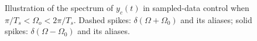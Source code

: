 \documentclass [11pt, proquest] {uwthesis}[2020/02/24]
\begin{document}
\begin{figure}[!ht]
\begin{centering}
{\begin{centering}
\par\end{centering}
}
\par\end{centering}
\begin{centering}
\par\end{centering}
\caption{\label{fig:Illustration-of-the}Illustration of the spectrum of $y_{c}(t)$
in sampled-data control when $\pi/T_{s}<\Omega_{o}<2\pi/T_{s}$. Dashed
spikes: $\delta(\Omega+\Omega_{0})$ and its aliases; solid spikes:
$\delta(\Omega-\Omega_{0})$ and its aliases.}
\end{figure}
\end{document}
